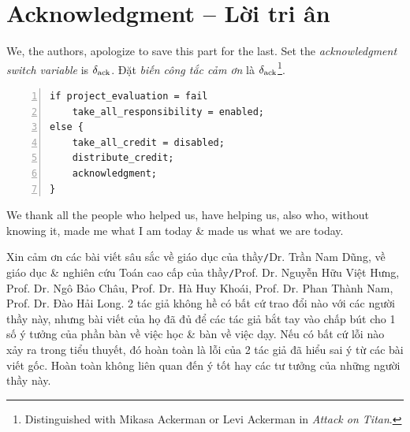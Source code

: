 \documentclass[12pt,twoside]{book}
\begin{document}

\appendix


\chapter{Acknowledgment -- Lời tri ân}
\minitoc
We, the authors, apologize to save this part for the last. Set the {\it acknowledgment switch variable} is $\delta_{\rm ack}$. Đặt {\it biến công tắc cảm ơn} là $\delta_{\rm ack}$\footnote{Distinguished with {\sc Mikasa Ackerman} or {\sc Levi Ackerman} in {\it Attack on Titan}.}.

\begin{Verbatim}[numbers=left,xleftmargin=5mm]
if project_evaluation = fail
    take_all_responsibility = enabled;
else {
    take_all_credit = disabled;
    distribute_credit;
    acknowledgment;
}
\end{Verbatim}
We thank all the people who helped us, have helping us, also who, without knowing it, made me what I am today \& made us what we are today.

Xin cảm ơn các bài viết sâu sắc về giáo dục của thầy{\tt/}Dr. {\sc Trần Nam Dũng}, về giáo dục \& nghiên cứu Toán cao cấp của thầy{\tt/}Prof. Dr. {\sc Nguyễn Hữu Việt Hưng}, Prof. Dr. {\sc Ngô Bảo Châu}, Prof. Dr. {\sc Hà Huy Khoái}, Prof. Dr. {\sc Phan Thành Nam}, Prof. Dr. {\sc Đào Hải Long}. 2 tác giả không hề có bất cứ trao đổi nào với các người thầy này, nhưng bài viết của họ đã đủ để các tác giả bắt tay vào chấp bút cho 1 số ý tưởng của phần bàn về việc học \& bàn về việc dạy. Nếu có bất cứ lỗi nào xảy ra trong tiểu thuyết, đó hoàn toàn là lỗi của 2 tác giả đã hiểu sai ý từ các bài viết gốc. Hoàn toàn không liên quan đến ý tốt hay các tư tưởng của những người thầy này.
\end{document}

